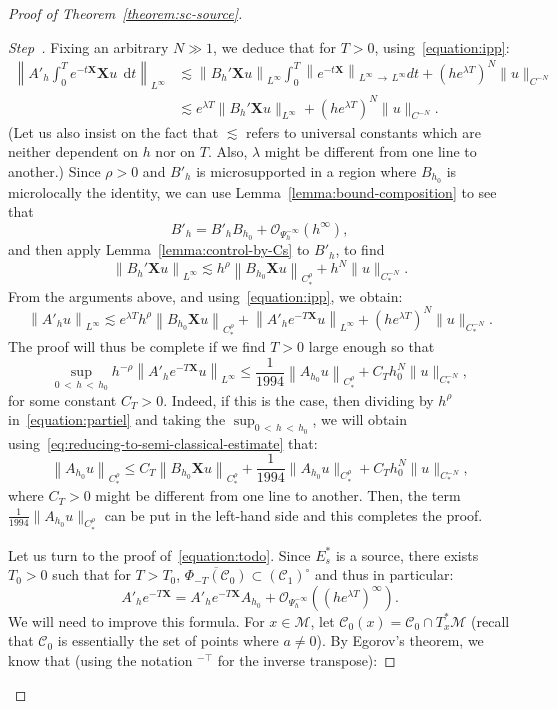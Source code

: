 \documentclass[10pt]{amsart}
\theoremstyle{definition}\newtheorem{defi}[theo]{Definition}\newtheorem{rema}[theo]{Remark}\newtheorem{exam}[theo]{Example}\newtheorem{exem}[theo]{Example}\newtheorem{nota}[theo]{Notation}
\newcommand{\X}{\mathbf{X}}
\newcommand{\mc}{\mathcal}
\newcommand{\M}{\mathcal{M}}
\newcommand{\clO}{\mathcal{O}}
\newcommand{\clC}{\mathcal{C}}
\newcommand{\dd}{\mathrm{d}}
\newcounter{stepcount}
\newenvironment{step}{\refstepcounter{stepcount}\begin{proof}[Step~\thestepcount]}{\let\qed\relax\end{proof}}
\begin{document}
\begin{proof}[Proof of Theorem~\ref{theorem:sc-source}]
\begin{step}
Fixing an arbitrary $N \gg 1$, we deduce that for $T>0$, using~\eqref{equation:ipp}:
\begin{align*}
\left\| A'_h \int_0^T e^{-t \X} \X u~~\dd t \right\|_{L^\infty} & \lesssim \left\| B_h'\X u\right\|_{L^\infty} \int_0^T \left\| e^{-t \X}\right\|_{L^\infty\,\rightarrow\,L^\infty} dt + \left(he^{\lambda T}\right)^N \|u\|_{C^{-N}} \\
& \lesssim e^{\lambda T} \| B_h'\X u\|_{L^\infty} + \left(he^{\lambda T}\right)^N \|u\|_{C^{-N}}.
\end{align*}
(Let us also insist on the fact that $\lesssim$ refers to universal constants which are neither dependent on $h$ nor on $T$. Also, $\lambda$ might be different from one line to another.) Since $\rho>0$ and $B'_h$ is microsupported in a region where $B_{h_0}$ is microlocally the identity, we can use Lemma~\ref{lemma:bound-composition} to see that
\[
B'_h = B'_h B_{h_0} + \clO_{\Psi^{-\infty}_h}\left(h^\infty\right),
\]
and then apply Lemma~\ref{lemma:control-by-Cs} to $B'_h$, to find
\[
\left\|B_h' \X u \right\|_{L^\infty} \lesssim h^{\rho}\left\| B_{h_0}\X u\right\|_{C^\rho_\ast} + h^N\|u\|_{C_*^{-N}}.
\]
From the arguments above, and using~\eqref{equation:ipp}, we obtain:
\begin{equation}\label{equation:partiel}
\left\| A'_h u \right\|_{L^\infty} \lesssim e^{\lambda T} h^\rho \left\| B_{h_0}\X u \right\|_{C^\rho_\ast} + \left\| A'_h e^{-T\X} u\right\|_{L^\infty} + \left(he^{\lambda T}\right)^N\|u\|_{C_*^{-N}}.
\end{equation}
The proof will thus be complete if we find $T>0$ large enough so that
\begin{equation}\label{equation:todo}
\sup_{0\,<\,h\,<\,h_0} h^{-\rho} \left\| A'_h e^{-T\X} u\right\|_{L^\infty} \leq \frac{1}{1994} \left\| A_{h_0} u\right\|_{C^\rho_\ast} + C_T h_0^N \|u\|_{C_*^{-N}},
\end{equation}
for some constant $C_T > 0$. Indeed, if this is the case, then dividing by $h^\rho$ in~\eqref{equation:partiel} and taking the $\sup_{0\,<\,h\,<\,h_0}$, we will obtain using~\eqref{eq:reducing-to-semi-classical-estimate} that:
\[
\left\|A_{h_0} u\right\|_{C^\rho_*} \leq C_T \left\|B_{h_0} \X u \right\|_{C^\rho_\ast} + \frac{1}{1994} \| A_{h_0} u\|_{C^\rho_\ast} + C_T h_0^N \|u\|_{C_*^{-N}},
\]
where $C_T\!>\!0$ might be different from one line to another. Then, the term $\frac{1}{1994}\!\| A_{h_0} u\|_{C^\rho_\ast}$ can be put in the left-hand side and this completes the proof.

Let us turn to the proof of~\eqref{equation:todo}. Since $E^\ast_s$ is a source, there exists $T_0>0$ such that for $T>T_0$, $\overline{\Phi_{-T}(\clC_0)} \subset (\clC_1)^{\circ}$ and thus in particular:
\[
A'_h e^{-T\X} = A'_h e^{-T \X} A_{h_0} + \mc{O}_{\Psi^{-\infty}_h}\left(\left(he^{\lambda T}\right)^\infty\right).
\]
We will need to improve this formula. For $x\in\M$, let $\clC_0(x)=\clC_0\cap T_x^*\M$ (recall that $\clC_0$ is essentially the set of points where $a\neq 0$). By Egorov's theorem, we know that (using the notation ${}^{-\top}$ for the inverse transpose):


\end{step}
\end{proof}
\end{document}
